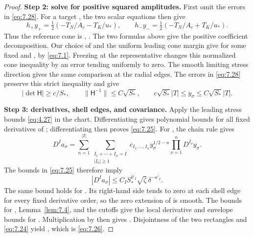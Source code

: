 \begin{proof}
\textbf{Step 2: solve for positive squared amplitudes.}
First omit the errors  in \eqref{eq:7.28}. For a
target , the two scalar equations then give
\[
  h_+y_+=\tfrac12(-T_N/A_c-T_K/u_*),
  \qquad
  h_-y_-=\tfrac12(-T_N/A_c+T_K/u_*).
\]
Thus the reference cone is ,
. The two formulas above give the
positive coefficient decomposition. Our choice of
 and the uniform leading cone margin give
 for some fixed
 and , by
\eqref{eq:7.1}. Freezing  at the representative
changes this normalized cone inequality by an error tending uniformly to
zero. The smooth limiting stress direction gives the same comparison at the
radial edges. The errors in \eqref{eq:7.28} preserve this strict inequality
and give
\begin{equation}
  |\det\mathsf H|\geq c/S_*,
  \qquad \lVert\mathsf H^{-1}\rVert\leq C\sqrt{S_*},
  \qquad c\sqrt{S_*}|T|\leq y_\sigma\leq C\sqrt{S_*}|T|.
  \tag{7.29}\label{eq:7.29}
\end{equation}

\textbf{Step 3: derivatives, shell edges, and covariance.}
Apply the leading stress bounds \eqref{eq:4.27} in the chart. Differentiating
 gives polynomial bounds for all fixed
derivatives of ; differentiating
 then proves \eqref{eq:7.25}. For
, the chain rule gives
\[
  D^Ia_\sigma=
  \sum_{n=1}^{|I|}
  \sum_{\substack{I_1+\cdots+I_n=I\\|I_\nu|\geq1}}
  c_{I_1,\ldots,I_n}y_\sigma^{1/2-n}
  \prod_{\nu=1}^nD^{I_\nu}y_\sigma.
\]
The bounds in \eqref{eq:7.25} therefore imply
\[
  |D^Ia_\sigma|\leq C_IS_*^{b'_I}\sqrt{\zeta}\,\delta^{-a'_I}.
\]
The same bound holds for . Its right-hand side tends
to zero at each shell edge for every fixed derivative order, so the zero
extension of  is smooth. The bounds for
, Lemma~\ref{lem:7.4}, and the cutoffs
 give the local derivative and envelope bounds
for . Multiplication by
 then gives
. Disjointness of the two
rectangles and \eqref{eq:7.24} yield
, which is \eqref{eq:7.26}.
\end{proof}
